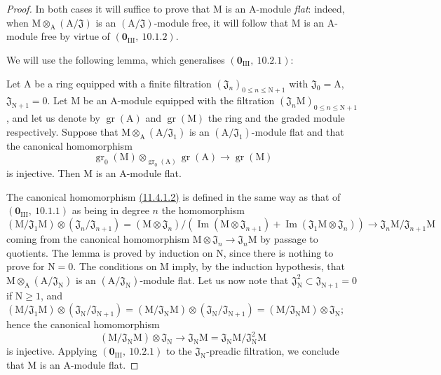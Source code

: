 \begin{proof}
In both cases it will suffice to prove that $\mathrm{M}$ is an $\mathrm{A}$-module \emph{flat}: indeed,
when $\mathrm{M}\otimes_\mathrm{A}(\mathrm{A}/\mathfrak{J})$ is an $(\mathrm{A}/\mathfrak{J})$-module free, it will follow that $\mathrm{M}$ is an $\mathrm{A}$-module
free by virtue of $(\mathbf{0}_{\mathrm{III}},~10.1.2)$.

We will use the following lemma, which generalises $(\mathbf{0}_{\mathrm{III}},~10.2.1)$:

\begin{lemma}[11.4.1.1]
\label{IV.11.4.1.1}
Let $\mathrm{A}$ be a ring equipped with a finite filtration $(\mathfrak{J}_n)_{0\leq n\leq\mathrm{N}+1}$ with
$\mathfrak{J}_0=\mathrm{A}$, $\mathfrak{J}_{\mathrm{N}+1}=0$. Let $\mathrm{M}$ be an $\mathrm{A}$-module equipped with the filtration $(\mathfrak{J}_n\mathrm{M})_{0\leq n\leq\mathrm{N}+1}$, and let us denote
by $\operatorname{gr}(\mathrm{A})$ and $\operatorname{gr}(\mathrm{M})$ the ring and the graded module respectively. Suppose that $\mathrm{M}\otimes_\mathrm{A}(\mathrm{A}/\mathfrak{J}_1)$
is an $(\mathrm{A}/\mathfrak{J}_1)$-module flat and that the canonical homomorphism
\[
\label{IV.11.4.1.2}
\operatorname{gr}_0(\mathrm{M})\otimes_{\operatorname{gr}_0(\mathrm{A})}\operatorname{gr}(\mathrm{A}) \to \operatorname{gr}(\mathrm{M})
\tag{11.4.1.2}
\]
is injective. Then $\mathrm{M}$ is an $\mathrm{A}$-module flat.
\end{lemma}

The canonical homomorphism {\hyperlink{ega4.c04.lem.11-4-1-2}{(11.4.1.2)}} is defined in the same way as that
of $(\mathbf{0}_{\mathrm{III}},~10.1.1)$ as being in degree $n$ the homomorphism
\[
(\mathrm{M}/\mathfrak{J}_1\mathrm{M})\otimes(\mathfrak{J}_n/\mathfrak{J}_{n+1})=(\mathrm{M}\otimes\mathfrak{J}_n)/(\operatorname{Im}(\mathrm{M}\otimes\mathfrak{J}_{n+1})+\operatorname{Im}(\mathfrak{J}_1\mathrm{M}\otimes\mathfrak{J}_n))\to\mathfrak{J}_n\mathrm{M}/\mathfrak{J}_{n+1}\mathrm{M}
\]
coming from the canonical homomorphism $\mathrm{M}\otimes\mathfrak{J}_n\to\mathfrak{J}_n\mathrm{M}$ by passage to quotients.
The lemma is proved by induction on $\mathrm{N}$, since there is nothing to prove for $\mathrm{N}=0$.
The conditions on $\mathrm{M}$ imply, by the induction hypothesis, that $\mathrm{M}\otimes_\mathrm{A}(\mathrm{A}/\mathfrak{J}_\mathrm{N})$
is an $(\mathrm{A}/\mathfrak{J}_\mathrm{N})$-module flat. Let us now note that $\mathfrak{J}_\mathrm{N}^2\subset\mathfrak{J}_{\mathrm{N}+1}=0$ if $\mathrm{N}\geq 1$, and
$(\mathrm{M}/\mathfrak{J}_1\mathrm{M})\otimes(\mathfrak{J}_\mathrm{N}/\mathfrak{J}_{\mathrm{N}+1})=(\mathrm{M}/\mathfrak{J}_\mathrm{N}\mathrm{M})\otimes(\mathfrak{J}_\mathrm{N}/\mathfrak{J}_{\mathrm{N}+1})=(\mathrm{M}/\mathfrak{J}_\mathrm{N}\mathrm{M})\otimes\mathfrak{J}_\mathrm{N}$; hence the canonical homomorphism
\[
(\mathrm{M}/\mathfrak{J}_\mathrm{N}\mathrm{M})\otimes\mathfrak{J}_\mathrm{N} \to \mathfrak{J}_\mathrm{N}\mathrm{M}=\mathfrak{J}_\mathrm{N}\mathrm{M}/\mathfrak{J}_\mathrm{N}^2\mathrm{M}
\]
is injective. Applying $(\mathbf{0}_{\mathrm{III}},~10.2.1)$ to the $\mathfrak{J}_\mathrm{N}$-preadic filtration, we conclude that
$\mathrm{M}$ is an $\mathrm{A}$-module flat.


\end{proof}
